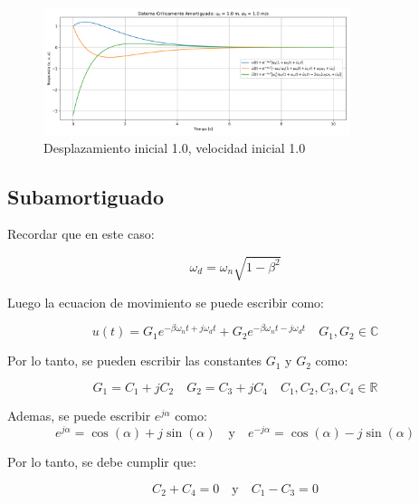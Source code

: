 \documentclass{article}  %
\begin{document}
\begin{figure}[H]
    \centering
    \includegraphics[width=0.8\textwidth]{GRAFICOS/sis_criticamente_amortiguado_u0_1.0_v0_1.0.png}
    \caption{Desplazamiento inicial 1.0, velocidad inicial 1.0}
    \label{fig:ejemplo1}
\end{figure}

\subsection{Subamortiguado}

Recordar que en este caso:

\begin{equation}
    \omega_d = \omega_n \sqrt{1 - \beta^2}
\end{equation}

Luego la ecuacion de movimiento se puede escribir como:

\begin{equation}
    u(t) = G_1 e^{-\beta \omega_n t + j \omega_d t} + G_2 e^{-\beta \omega_n t - j \omega_d t} \quad G_1, G_2 \in \mathbb{C}
\end{equation}

Por lo tanto, se pueden escribir las constantes $G_1$ y $G_2$ como:

\begin{equation}
    G_1 = C_1 + jC_2 \quad G_2 = C_3 + jC_4 \quad C_1, C_2, C_3, C_4 \in \mathbb{R}
\end{equation}

Ademas, se puede escribir $e^{j\alpha}$ como:
\begin{equation}
    e^{j\alpha} = \cos(\alpha) + j\sin(\alpha) \quad \text{y} \quad e^{-j\alpha} = \cos(\alpha) - j\sin(\alpha)
\end{equation}

Por lo tanto, se debe cumplir que:

\begin{equation}
    C_2 + C_4 = 0 \quad \text{y} \quad C_1 - C_3 = 0
\end{equation}
\end{document}
